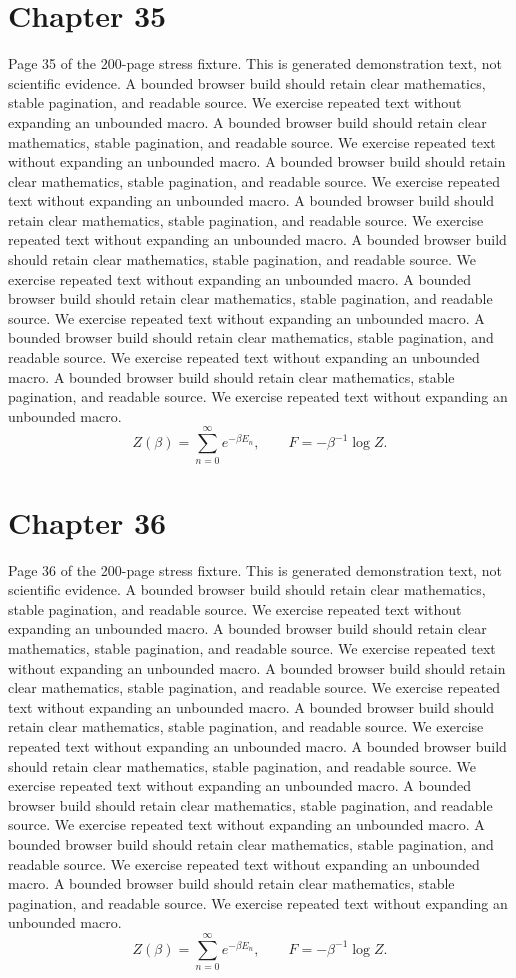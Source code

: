 \documentclass[11pt]{article}
\begin{document}
\section*{Chapter 35}
Page 35 of the 200-page stress fixture. This is generated demonstration text, not scientific evidence.
A bounded browser build should retain clear mathematics, stable pagination, and readable source. We exercise repeated text without expanding an unbounded macro.
A bounded browser build should retain clear mathematics, stable pagination, and readable source. We exercise repeated text without expanding an unbounded macro.
A bounded browser build should retain clear mathematics, stable pagination, and readable source. We exercise repeated text without expanding an unbounded macro.
A bounded browser build should retain clear mathematics, stable pagination, and readable source. We exercise repeated text without expanding an unbounded macro.
A bounded browser build should retain clear mathematics, stable pagination, and readable source. We exercise repeated text without expanding an unbounded macro.
A bounded browser build should retain clear mathematics, stable pagination, and readable source. We exercise repeated text without expanding an unbounded macro.
A bounded browser build should retain clear mathematics, stable pagination, and readable source. We exercise repeated text without expanding an unbounded macro.
A bounded browser build should retain clear mathematics, stable pagination, and readable source. We exercise repeated text without expanding an unbounded macro.
\[Z(\beta)=\sum_{n=0}^{\infty}e^{-\beta E_n},\qquad F=-\beta^{-1}\log Z.\]
\newpage
\section*{Chapter 36}
Page 36 of the 200-page stress fixture. This is generated demonstration text, not scientific evidence.
A bounded browser build should retain clear mathematics, stable pagination, and readable source. We exercise repeated text without expanding an unbounded macro.
A bounded browser build should retain clear mathematics, stable pagination, and readable source. We exercise repeated text without expanding an unbounded macro.
A bounded browser build should retain clear mathematics, stable pagination, and readable source. We exercise repeated text without expanding an unbounded macro.
A bounded browser build should retain clear mathematics, stable pagination, and readable source. We exercise repeated text without expanding an unbounded macro.
A bounded browser build should retain clear mathematics, stable pagination, and readable source. We exercise repeated text without expanding an unbounded macro.
A bounded browser build should retain clear mathematics, stable pagination, and readable source. We exercise repeated text without expanding an unbounded macro.
A bounded browser build should retain clear mathematics, stable pagination, and readable source. We exercise repeated text without expanding an unbounded macro.
A bounded browser build should retain clear mathematics, stable pagination, and readable source. We exercise repeated text without expanding an unbounded macro.
\[Z(\beta)=\sum_{n=0}^{\infty}e^{-\beta E_n},\qquad F=-\beta^{-1}\log Z.\]
\newpage
\end{document}
